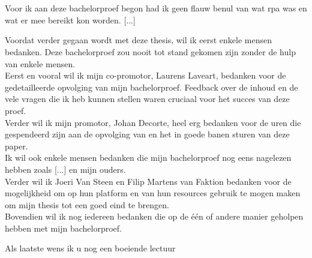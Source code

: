 
\chapter*{}
\label{ch:voorwoord}

Voor ik aan deze bachelorproef begon had ik geen flauw benul van wat \acrlong{rpa} was en wat er mee bereikt kon worden. [...]

Voordat verder gegaan wordt met deze thesis, wil ik eerst enkele mensen bedanken. Deze bachelorproef zou nooit tot stand gekomen zijn zonder de hulp van enkele mensen.\\
Eerst en vooral wil ik mijn co-promotor, Laurens Laveart, bedanken voor de gedetailleerde
opvolging van mijn bachelorproef. Feedback over de inhoud en de vele vragen die ik heb kunnen stellen waren cruciaal voor het succes van deze proef.\\
Verder wil ik mijn promotor, Johan Decorte, heel erg bedanken voor de uren die
gespendeerd zijn aan de opvolging van en het in goede banen sturen van deze paper.\\
Ik wil ook enkele mensen bedanken die mijn bachelorproef nog eens nagelezen hebben
zoals [...] en mijn ouders.\\
Verder wil ik Joeri Van Steen en Filip Martens van Faktion bedanken voor de mogelijkheid om op hun platform en van hun resources gebruik te mogen maken om mijn thesis tot een goed eind te brengen. \\
Bovendien wil ik nog iedereen bedanken die op de één of andere manier geholpen hebben
met mijn bachelorproef.

Als laatste wens ik u nog een boeiende lectuur

